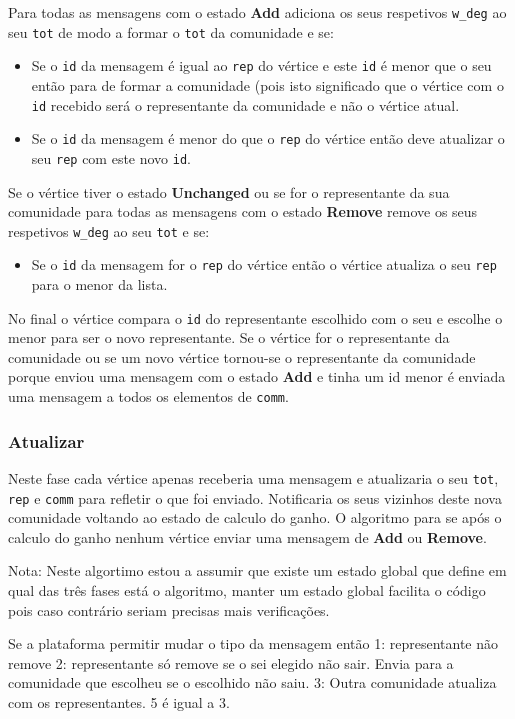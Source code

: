 \documentclass[a4paper,10pt]{report}
\begin{document}
Para todas as mensagens com o estado \textbf{Add} adiciona os seus respetivos \verb|w_deg| ao seu \verb|tot| de modo a formar o \verb|tot| da comunidade e se:
\begin{itemize}
	\item Se o \verb|id| da mensagem é igual ao \verb|rep| do vértice e este \verb|id| é menor que o seu então para de formar a comunidade (pois isto significado que o vértice com o \verb|id| recebido será o representante da comunidade e não o vértice atual.
	\item Se o \verb|id| da mensagem é menor do que o \verb|rep| do vértice então deve atualizar o seu \verb|rep| com este novo \verb|id|.
\end{itemize}
Se o vértice tiver o estado \textbf{Unchanged} ou se for o representante da sua comunidade para todas as mensagens com o estado \textbf{Remove} remove os seus respetivos \verb|w_deg| ao seu \verb|tot| e se:
\begin{itemize}
	\item Se o \verb|id| da mensagem for o \verb|rep| do vértice então o vértice atualiza o seu \verb|rep| para o menor da lista.
\end{itemize}
No final o vértice compara o \verb|id| do representante escolhido com o seu e escolhe o menor para ser o novo representante. Se o vértice for o representante da comunidade ou se um novo vértice tornou-se o representante da comunidade porque enviou uma mensagem com o estado \textbf{Add} e tinha um id menor é enviada uma mensagem a todos os elementos de \verb|comm|.

\subsubsection*{Atualizar}
Neste fase cada vértice apenas receberia uma mensagem e atualizaria o seu \verb|tot|, \verb|rep| e \verb|comm| para refletir o que foi enviado. Notificaria os seus vizinhos deste nova comunidade voltando ao estado de calculo do ganho. O algoritmo para se após o calculo do ganho nenhum vértice enviar uma mensagem de \textbf{Add} ou \textbf{Remove}.


Nota: Neste algortimo estou a assumir que existe um estado global que define em qual das três fases está o algoritmo, manter um estado global facilita o código pois caso contrário seriam precisas mais verificações.
%
%
%
%

Se a plataforma permitir mudar o tipo da mensagem então 1: representante não remove
2: representante só remove se o sei elegido não sair. Envia para a comunidade que escolheu se o escolhido não saiu.
3: Outra comunidade atualiza com os representantes. 5 é igual a 3.
\end{document}
